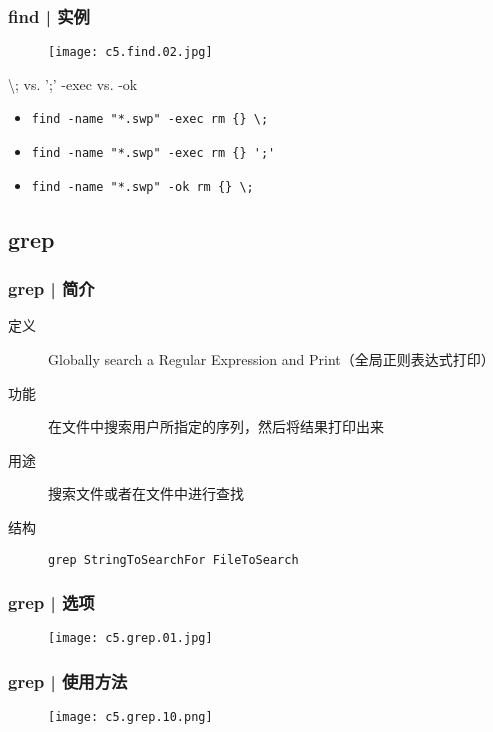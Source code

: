 \begin{frame}[fragile]
  \frametitle{find | \alert{实例}}
  \begin{figure}
    \centering
    \texttt{[image: c5.find.02.jpg]}
  \end{figure}
  \pause
  \begin{block}{\textbackslash; vs. ';' \qquad -exec vs. -ok}
  \begin{itemize}
    \item \verb|find -name "*.swp" -exec rm {} \;|
    \item \verb|find -name "*.swp" -exec rm {} ';'|
    \item \verb|find -name "*.swp" -ok rm {} \;|
  \end{itemize}
  \end{block}
\end{frame}

\subsection{grep}
\begin{frame}[fragile]
  \frametitle{grep | 简介}
  \begin{description}
    \item[定义] Globally search a Regular Expression and Print（全局正则表达式打印）
    \item[功能] 在文件中搜索用户所指定的序列，然后将结果打印出来
    \item[用途] 搜索文件或者在文件中进行查找
    \item[结构] \verb|grep StringToSearchFor FileToSearch|
  \end{description}
\end{frame}

\begin{frame}
  \frametitle{grep | \alert{选项}}
  \begin{figure}
    \centering
    \texttt{[image: c5.grep.01.jpg]}
  \end{figure}
\end{frame}

\begin{frame}
  \frametitle{grep | 使用方法}
  \begin{figure}
    \centering
    \texttt{[image: c5.grep.10.png]}
  \end{figure}
\end{frame}


